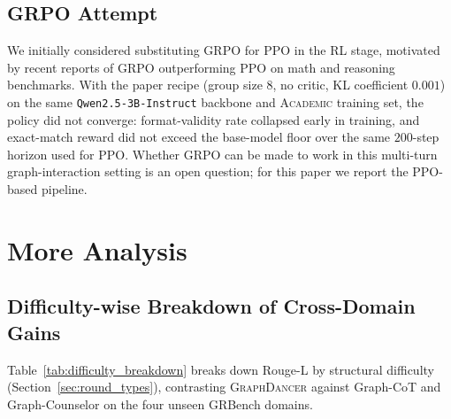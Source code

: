 \documentclass[11pt]{article}
\newcommand{\ours}{\textsc{GraphDancer}\xspace}
\begin{document}
\subsection{GRPO Attempt}
\label{app:grpo}
We initially considered substituting GRPO \cite{guo2025deepseek} for PPO in the RL stage, motivated by recent reports of GRPO outperforming PPO on math and reasoning benchmarks. With the paper recipe (group size 8, no critic, KL coefficient $0.001$) on the same \texttt{Qwen2.5-3B-Instruct} backbone and \textsc{Academic} training set, the policy did not converge: format-validity rate collapsed early in training, and exact-match reward did not exceed the base-model floor over the same $200$-step horizon used for PPO. Whether GRPO can be made to work in this multi-turn graph-interaction setting is an open question; for this paper we report the PPO-based pipeline.
\fi

\section{More Analysis}
\label{sec:appendix_analysis}

\subsection{Difficulty-wise Breakdown of Cross-Domain Gains}
\label{sec:curriculum_analysis}

Table~\ref{tab:difficulty_breakdown} breaks down Rouge-L by structural difficulty (Section~\ref{sec:round_types}), contrasting \ours against Graph-CoT and Graph-Counselor on the four unseen GRBench domains.
\end{document}
